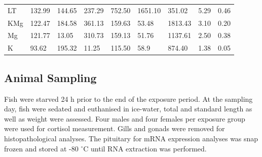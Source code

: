\documentclass[twoside]{article}
\begin{document}
\begin{multicols}{2}
\begin{table}[H]
{\begin{tabular}{@{}lllllllll@{}}
LT   & 132.99                                                     & 144.65                                                 & 237.29                                                    & 752.50                                                   & 1651.10                                                  & 351.02                                                     & 5.29                                                                      & 0.46                                                      \\
KMg      & 122.47                                                     & 184.58                                                 & 361.13                                                    & 159.63                                                   & 53.48                                                    & 1813.43                                                    & 3.10                                                                      & 0.20                                                      \\
Mg       & 121.77                                                     & 13.05                                                  & 310.73                                                    & 159.13                                                   & 51.76                                                    & 1137.61                                                    & 2.50                                                                      & 0.38                                                      \\
K        & 93.62                                                      & 195.32                                                 & 11.25                                                     & 115.50                                                   & 58.9                                                     & 874.40                                                     & 1.38                                                                      & 0.05                                                      \\ \bottomrule
\end{tabular}}
\end{table}

\subsection{Animal Sampling}

Fish were starved 24 h prior to the end of the exposure period. At the sampling day, fish were sedated and euthanised in ice-water, total and standard length as well as weight were assessed. Four males and four females per exposure group were used for cortisol measurement. Gills and gonads were removed for histopathological analyses. The pituitary for mRNA expression analyses was snap frozen and stored at -80 $^{\circ}$C until RNA extraction was performed.



\end{multicols}
\end{document}
